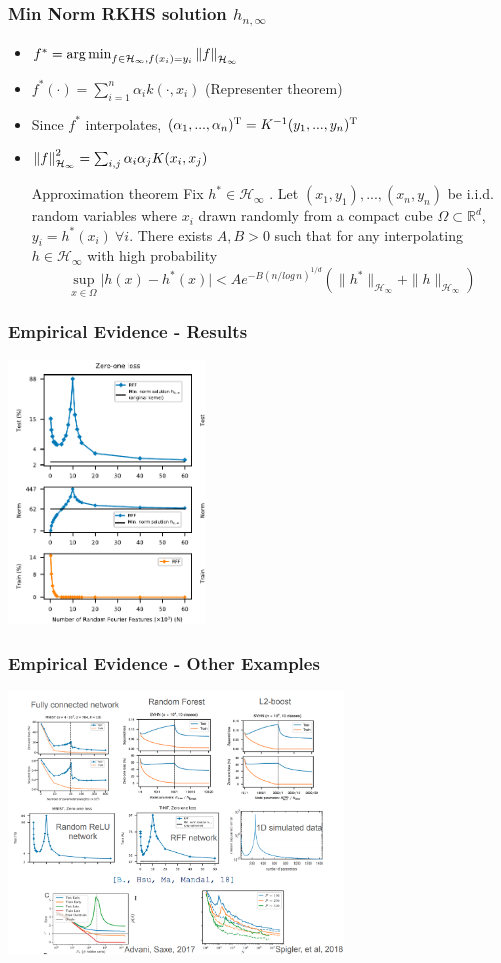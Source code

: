 \documentclass{beamer}
\newcommand\norm[1]{\left\lVert#1\right\rVert}
\begin{document}
\begin{frame}
\frametitle{Min Norm  RKHS solution $h_{n, \infty}$}
\begin{itemize}[itemsep = 12pt]
	\item $f^* = \argmin_{f\in\RKHSGauss, f(x_i) = y_i} \norm{f}_{\RKHSGauss}$ 
	\item $f^*(\cdot) =\sum_{i=1}^{n} \alpha_i k(\cdot, x_i) $ (Representer theorem)
	\item Since $f^*$ interpolates, $(\alpha_1,..., \alpha_n)^{\text{T}} = K^{-1} (y_1,..., y_n)^{\text{T}}$
	\item $\norm{f}_{\RKHSGauss}^2 = \sum_{i,j} \alpha_i \alpha_j K(x_i,x_j) $
	\begin{block}{Approximation theorem}
		Fix $h^* \in \mathcal{H}_\infty $  .
		Let $(x_1,y_1), ..., (x_n,y_n)$ be i.i.d. random variables where $x_i$ drawn randomly from a compact cube $\Omega \subset \mathbb{R}^d $,
		$y_i = h^*(x_i) \: \forall i$. There exists $A, B > 0$ such that for any interpolating $h \in \mathcal{H}_\infty $ with high probability
		\[ \sup_{x \in \Omega} \vert h(x) - h^*(x)\vert < A e^{-B(n/log \, n)^{1/d}} (\| h^* \|_{\mathcal{H}_\infty} + \| h \|_{\mathcal{H}_\infty}) \]
	\end{block}
\end{itemize}
\end{frame}

\begin{frame}
\frametitle{Empirical Evidence - Results}
\centering
\includegraphics[height=7cm]{RFF-results.png}
\end{frame}

\begin{frame}
\frametitle{Empirical Evidence - Other Examples}
\centering
\includegraphics[height=7cm]{Double_Descent_Examples.png}
\end{frame}
\end{document}
